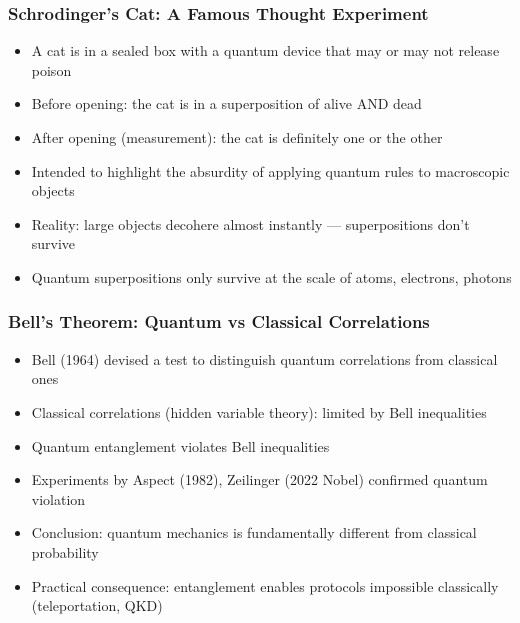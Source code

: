 \begin{frame}[fragile]\frametitle{Schrodinger's Cat: A Famous Thought Experiment}
\begin{itemize}
\item A cat is in a sealed box with a quantum device that may or may not release poison
\item Before opening: the cat is in a superposition of alive AND dead
\item After opening (measurement): the cat is definitely one or the other
\item Intended to highlight the absurdity of applying quantum rules to macroscopic objects
\item Reality: large objects decohere almost instantly --- superpositions don't survive
\item Quantum superpositions only survive at the scale of atoms, electrons, photons
\end{itemize}
\end{frame}

\begin{frame}[fragile]\frametitle{Bell's Theorem: Quantum vs Classical Correlations}
\begin{itemize}
\item Bell (1964) devised a test to distinguish quantum correlations from classical ones
\item Classical correlations (hidden variable theory): limited by Bell inequalities
\item Quantum entanglement violates Bell inequalities
\item Experiments by Aspect (1982), Zeilinger (2022 Nobel) confirmed quantum violation
\item Conclusion: quantum mechanics is fundamentally different from classical probability
\item Practical consequence: entanglement enables protocols impossible classically (teleportation, QKD)
\end{itemize}
\end{frame}

